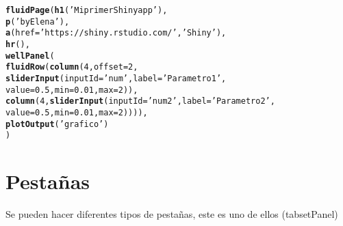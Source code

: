 \documentclass[11pt, oneside]{article}\usepackage[]{graphicx}\usepackage[]{color}
\makeatletter
\newcommand{\hlnum}[1]{\textcolor[rgb]{0.686,0.059,0.569}{#1}}%
\newcommand{\hlstr}[1]{\textcolor[rgb]{0.192,0.494,0.8}{#1}}%
\newcommand{\hlstd}[1]{\textcolor[rgb]{0.345,0.345,0.345}{#1}}%
\newcommand{\hlkwc}[1]{\textcolor[rgb]{0.333,0.667,0.333}{#1}}%
\newcommand{\hlkwd}[1]{\textcolor[rgb]{0.737,0.353,0.396}{\textbf{#1}}}%
\newenvironment{kframe}{%
 \def\at@end@of@kframe{}%
 \ifinner\ifhmode%
  \def\at@end@of@kframe{\end{minipage}}%
  \begin{minipage}{\columnwidth}%
 \fi\fi%
 \def\FrameCommand##1{\hskip\@totalleftmargin \hskip-\fboxsep
 \colorbox{shadecolor}{##1}\hskip-\fboxsep
     \hskip-\linewidth \hskip-\@totalleftmargin \hskip\columnwidth}%
 \MakeFramed {\advance\hsize-\width
   \@totalleftmargin\z@ \linewidth\hsize
   \@setminipage}}%
 {\par\unskip\endMakeFramed%
 \at@end@of@kframe}
\newenvironment{knitrout}{}{} %
\makeatother
\begin{document}
\begin{knitrout}
\color{fgcolor}\begin{kframe}
\begin{alltt}
\hlkwd{fluidPage}\hlstd{(}\hlkwd{h1}\hlstd{(}\hlstr{'Mi primer Shiny app'}\hlstd{),}
          \hlkwd{p}\hlstd{(}\hlstr{'by Elena'}\hlstd{),}
          \hlkwd{a}\hlstd{(}\hlkwc{href}\hlstd{=}\hlstr{'https://shiny.rstudio.com/'}\hlstd{,}\hlstr{'Shiny'}\hlstd{),}
          \hlkwd{hr}\hlstd{(),}
          \hlkwd{wellPanel}\hlstd{(}
          \hlkwd{fluidRow}\hlstd{(}\hlkwd{column}\hlstd{(}\hlnum{4}\hlstd{,}\hlkwc{offset}\hlstd{=}\hlnum{2}\hlstd{,}
                          \hlkwd{sliderInput}\hlstd{(}\hlkwc{inputId}\hlstd{=} \hlstr{'num'}\hlstd{,}\hlkwc{label}\hlstd{=}\hlstr{'Parametro 1'}\hlstd{,}
                                      \hlkwc{value}\hlstd{=}\hlnum{0.5}\hlstd{,} \hlkwc{min}\hlstd{=}\hlnum{0.01}\hlstd{,} \hlkwc{max}\hlstd{=}\hlnum{2}\hlstd{)),}
                   \hlkwd{column}\hlstd{(}\hlnum{4}\hlstd{,}\hlkwd{sliderInput}\hlstd{(}\hlkwc{inputId}\hlstd{=} \hlstr{'num2'}\hlstd{,} \hlkwc{label}\hlstd{=}\hlstr{'Parametro 2'}\hlstd{,}
                                       \hlkwc{value}\hlstd{=}\hlnum{0.5}\hlstd{,} \hlkwc{min}\hlstd{=}\hlnum{0.01}\hlstd{,}  \hlkwc{max}\hlstd{=}\hlnum{2}\hlstd{)))),}
          \hlkwd{plotOutput}\hlstd{(}\hlstr{'grafico'}\hlstd{)}
\hlstd{)}
\end{alltt}
\end{kframe}
\end{knitrout}


\section{Pestañas}

Se pueden hacer diferentes tipos de pestañas, este es uno de ellos (tabsetPanel)
\end{document}
